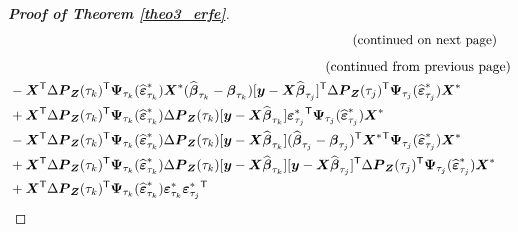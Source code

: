 \documentclass[15pt,a4paper]{article}
\newcommand{\transpose}{{}^{\text{\sffamily T}}}
\begin{document}
\begin{proof}[\textbf{Proof of Theorem \ref{theo3_erfe}}]
\begin{equation*}
\begin{split}
&\hspace{5.12in}\llap{\text{(continued on next page)}}
\end{split}
\end{equation*}       
\clearpage
\begin{equation*}
\begin{split}
& \hspace{5.12in}\llap{\text{(continued from previous page)}}\\
& - \boldsymbol{X}\transpose\Delta\boldsymbol{P}_{\boldsymbol{Z}}(\tau_k)\transpose\boldsymbol{\Psi}_{\tau_k}(\widehat{\boldsymbol{\varepsilon}}^{*}_{\tau_k})\boldsymbol{X}^{*} (\widehat{\boldsymbol{\beta}}_{\tau_{k}} -
        \boldsymbol{\beta}_{\tau_{k}})[\boldsymbol{y}-\boldsymbol{X}\widehat{\boldsymbol{\beta}}_{\tau_{j}}]\transpose\Delta\boldsymbol{P}_{\boldsymbol{Z}}(\tau_{j})\transpose\boldsymbol{\Psi}_{\tau_j}
        (\widehat{\boldsymbol{\varepsilon}}^{*}_{\tau_j})\boldsymbol{X}^{*}\\
& + \boldsymbol{X}\transpose\Delta\boldsymbol{P}_{\boldsymbol{Z}}(\tau_k)\transpose\boldsymbol{\Psi}_{\tau_k}(\widehat{\boldsymbol{\varepsilon}}^{*}_{\tau_k})\Delta\boldsymbol{P}_{\boldsymbol{Z}}(\tau_{k})
[\boldsymbol{y}-\boldsymbol{X}\widehat{\boldsymbol{\beta}}_{\tau_{k}}]\boldsymbol{\varepsilon}^{*}_{\tau_{j}}\transpose\boldsymbol{\Psi}_{\tau_j}(\widehat{\boldsymbol{\varepsilon}}^{*}_{\tau_j})\boldsymbol{X}^{*}\\
& - \boldsymbol{X}\transpose\Delta\boldsymbol{P}_{\boldsymbol{Z}}(\tau_k)\transpose\boldsymbol{\Psi}_{\tau_k}(\widehat{\boldsymbol{\varepsilon}}^{*}_{\tau_k})\Delta\boldsymbol{P}_{\boldsymbol{Z}}(\tau_{k})
        [\boldsymbol{y}-\boldsymbol{X}\widehat{\boldsymbol{\beta}}_{\tau_{k}}](\widehat{\boldsymbol{\beta}}_{\tau_{j}} - \boldsymbol{\beta}_{\tau_{j}})\transpose\boldsymbol{X}^{*}\transpose\boldsymbol{\Psi}_{\tau_j}(\widehat{\boldsymbol{\varepsilon}}^{*}_{\tau_j})\boldsymbol{X}^{*}\\
& + \boldsymbol{X}\transpose\Delta\boldsymbol{P}_{\boldsymbol{Z}}(\tau_k)\transpose\boldsymbol{\Psi}_{\tau_k}(\widehat{\boldsymbol{\varepsilon}}^{*}_{\tau_k})\Delta\boldsymbol{P}_{\boldsymbol{Z}}(\tau_{k})[\boldsymbol{y}-
\boldsymbol{X}\widehat{\boldsymbol{\beta}}_{\tau_{k}}][\boldsymbol{y}-\boldsymbol{X}\widehat{\boldsymbol{\beta}}_{\tau_{j}}]\transpose\Delta\boldsymbol{P}_{\boldsymbol{Z}}(\tau_{j})\transpose
        \boldsymbol{\Psi}_{\tau_j}(\widehat{\boldsymbol{\varepsilon}}^{*}_{\tau_j})\boldsymbol{X}^{*}\\
& + \boldsymbol{X}\transpose\Delta\boldsymbol{P}_{\boldsymbol{Z}}(\tau_k)\transpose\boldsymbol{\Psi}_{\tau_k}(\widehat{\boldsymbol{\varepsilon}}^{*}_{\tau_k})\boldsymbol{\varepsilon}^{*}_{\tau_{k}}\boldsymbol{\varepsilon}^{*}_{\tau_{j}}\transpose

\end{split}
\end{equation*}
\end{proof}
\end{document}

